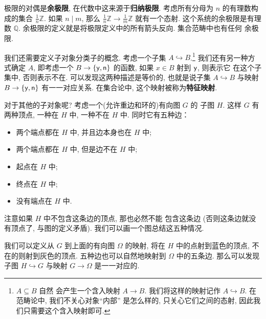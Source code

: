 极限的对偶是\textbf{余极限}, 在代数中这来源于\textbf{归纳极限}.
考虑所有分母为 \(n\) 的有理数构成的集合 \(\frac1n\mathbb Z\).
如果 \(n\mid m\), 那么 \(\frac1n\mathbb Z \to \frac1m
\mathbb Z\) 就有一个态射. 这个系统的余极限是有理数 \(\mathbb Q\).
余极限的定义就是将极限定义中的所有箭头反向. 集合范畴中也有任何
余极限.

我们还需要定义子对象分类子的概念. 考虑一个子集
\(A \hookrightarrow B\).\footnote{\(A \subseteq B\) 自然
会产生一个含入映射 \(A \to B\). 我们将这样的映射记作
\(A \hookrightarrow B\). 在范畴论中, 我们不关心对象“内部”
是怎么样的, 只关心它们之间的态射, 因此我们只需要这个含入映射即可.}
我们还有另一种方式确定 \(A\), 即考虑一个
\(B \to \{\textnormal{\textsf{y}}, \textnormal{\textsf{n}}\}\)
的函数, 如果 \(x \in B\) 射到 \(\textnormal{\textsf{y}}\), 则表示它
在这个子集中, 否则表示不在. 可以发现这两种描述是等价的,
也就是说子集 \(A \hookrightarrow B\) 与映射
\(B \to \{\textnormal{\textsf{y}},\textnormal{\textsf{n}}\}\) 有一一对应关系.
在集合论中, 这个映射被称为\textbf{特征映射}.

对于其他的子对象呢? 考虑一个(允许重边和环的)有向图 \(G\) 的
子图 \(H\). 这样 \(G\) 有两种顶点, 一种在 \(H\) 中,
一种不在 \(H\) 中. 同时它有五种边：
\begin{itemize}
\item 两个端点都在 \(H\) 中, 并且边本身也在 \(H\) 中;
\item 两个端点都在 \(H\) 中, 但是边不在 \(H\) 中;
\item 起点在 \(H\) 中;
\item 终点在 \(H\) 中;
\item 没有端点在 \(H\) 中.
\end{itemize}
注意如果 \(H\) 中不包含这条边的顶点, 那也必然不能
包含这条边 (否则这条边就没有顶点了, 与图的定义矛盾).
我们可以画一个图总结这五种情况.
\begin{center}
\end{center}
我们可以定义从 \(G\) 到上面的有向图 \(\Omega\) 的映射,
将在 \(H\) 中的点射到蓝色的顶点, 不在的则射到灰色的顶点.
五种边也可以自然地映射到 \(\Omega\) 中的五条边. 那么可以发现
子图 \(H \hookrightarrow G\) 与映射 \(G \to \Omega\)
是一一对应的.

